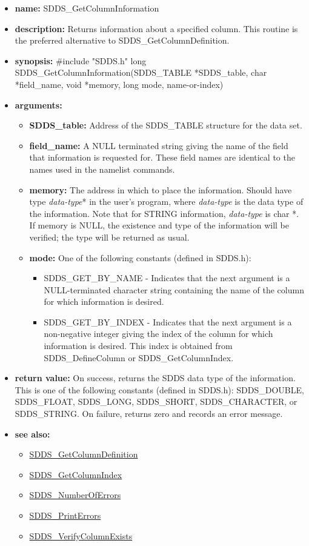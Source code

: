 \documentclass[11pt]{article}
\newcommand{\progref}[1]{\hyperref{SDDS_#1}{{\tt SDDS\_#1} (}{)}{SDDS_#1}}
\begin{document}
\begin{itemize}
\item {\bf name:}\newline
SDDS\_GetColumnInformation
\item {\bf description:}\newline
Returns information about a specified column. This routine is the preferred alternative to SDDS\_GetColumnDefinition.
\item {\bf synopsis:} \#include "SDDS.h"\newline
long SDDS\_GetColumnInformation(SDDS\_TABLE *SDDS\_table, char *field\_name, void *memory, long mode,  name-or-index)
\item {\bf arguments:}
\begin{itemize}
\item {\bf SDDS\_table:} Address of the SDDS\_TABLE structure for the data set.
\item {\bf field\_name:} A NULL terminated string giving the name of the field that information is requested for. These field names are identical to the names used in the namelist commands.
\item {\bf memory:} The address in which to place the information. Should have type {\em data-type}* in the user's program, where {\em data-type} is the data type of the information. Note that for STRING information, {\em data-type} is char *. If memory is NULL, the existence and type of the information will be verified; the type will be returned as usual.
\item {\bf mode:} One of the following constants (defined in SDDS.h):
\begin{itemize}
\item SDDS\_GET\_BY\_NAME -  Indicates that the next argument is a NULL-terminated character string containing the name of the column for which information is desired.
\item SDDS\_GET\_BY\_INDEX - Indicates that the next argument is a non-negative integer giving the index of the column for which information is desired. This index is obtained from SDDS\_DefineColumn or SDDS\_GetColumnIndex.
\end{itemize}
\end{itemize}
\item {\bf return value:}\newline
On success, returns the SDDS data type of the information. This is one of the following constants (defined in SDDS.h): SDDS\_DOUBLE, SDDS\_FLOAT, SDDS\_LONG, SDDS\_SHORT, SDDS\_CHARACTER, or SDDS\_STRING.\newline
\newline
On failure, returns zero and records an error message. 
\item {\bf see also:}
\begin{itemize}
\item \progref{GetColumnDefinition}
\item \progref{GetColumnIndex}
\item \progref{NumberOfErrors}
\item \progref{PrintErrors}
\item \progref{VerifyColumnExists}
\end{itemize}
\end{itemize}
\end{document}
